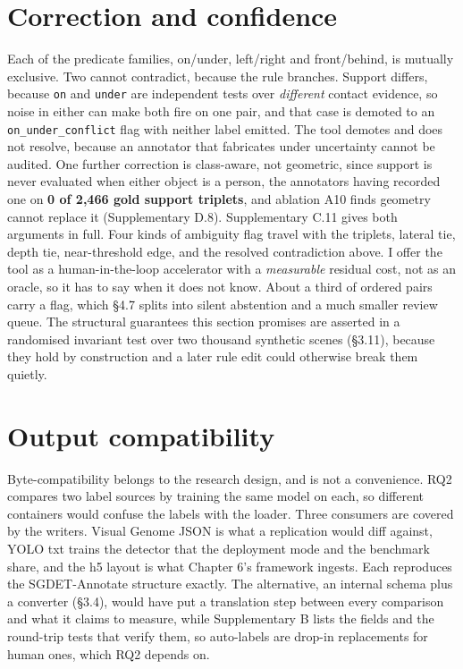 \section{Correction and confidence}

Each of the predicate families, on/under, left/right and front/behind, is mutually exclusive. Two cannot contradict, because the rule branches. Support differs, because \texttt{on} and \texttt{under} are independent tests over \textit{different} contact evidence, so noise in either can make both fire on one pair, and that case is demoted to an \texttt{on\_\allowbreak{}under\_\allowbreak{}conflict} flag with neither label emitted. The tool demotes and does not resolve, because an annotator that fabricates under uncertainty cannot be audited. One further correction is class-aware, not geometric, since support is never evaluated when either object is a person, the annotators having recorded one on \textbf{0 of 2,466 gold support triplets}, and ablation A10 finds geometry cannot replace it (Supplementary D.8). Supplementary C.11 gives both arguments in full. Four kinds of ambiguity flag travel with the triplets, lateral tie, depth tie, near-threshold edge, and the resolved contradiction above. I offer the tool as a human-in-the-loop accelerator with a \textit{measurable} residual cost, not as an oracle, so it has to say when it does not know. About a third of ordered pairs carry a flag, which \S{}4.7 splits into silent abstention and a much smaller review queue. The structural guarantees this section promises are asserted in a randomised invariant test over two thousand synthetic scenes (\S{}3.11), because they hold by construction and a later rule edit could otherwise break them quietly.

\section{Output compatibility}

Byte-compatibility belongs to the research design, and is not a convenience. RQ2 compares two label sources by training the same model on each, so different containers would confuse the labels with the loader. Three consumers are covered by the writers. Visual Genome JSON is what a replication would diff against, YOLO txt trains the detector that the deployment mode and the benchmark share, and the h5 layout is what Chapter 6's framework ingests. Each reproduces the SGDET-Annotate structure exactly. The alternative, an internal schema plus a converter (\S{}3.4), would have put a translation step between every comparison and what it claims to measure, while Supplementary B lists the fields and the round-trip tests that verify them, so auto-labels are drop-in replacements for human ones, which RQ2 depends on.

